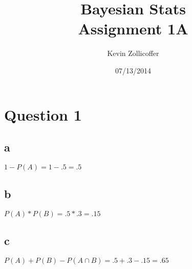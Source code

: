 \documentclass{article}
\author{Kevin Zollicoffer}
\title{Bayesian Stats\\Assignment 1A}
\date{07/13/2014}
\begin{document}
\maketitle


\section*{Question 1}
\subsection*{a}
$1-P(A) = 1 -.5 = .5$

\subsection*{b}
$P(A) * P(B) = .5*.3 = .15$

\subsection*{c}
$P(A) + P(B) - P(A \cap B) = .5+.3 - .15 = .65$
\end{document}
